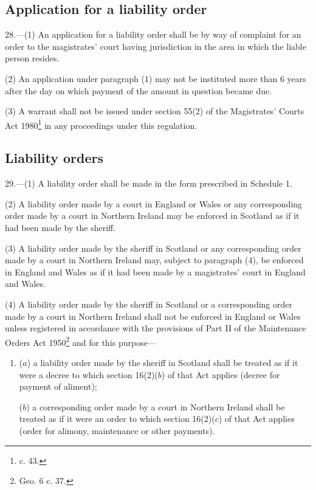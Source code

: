 \documentclass[12pt,a4paper]{article}
\begin{document}
\subsection[28. Application for a liability order]{Application for a liability order}

28.—(1) An application for a liability order shall be by way of complaint for an order to the magistrates' court having jurisdiction in the area in which the liable person resides.

(2) An application under paragraph (1) may not be instituted more than 6 years after the day on which payment of the amount in question became due.

(3) A warrant shall not be issued under section 55(2) of the Magistrates' Courts Act 1980\footnote{ c. 43.} in any proceedings under this regulation.

\subsection[29. Liability orders]{Liability orders}

29.—(1) A liability order shall be made in the form prescribed in Schedule 1.

(2) A liability order made by a court in England or Wales or any corresponding order made by a court in Northern Ireland may be enforced in Scotland as if it had been made by the sheriff.

(3) A liability order made by the sheriff in Scotland or any corresponding order made by a court in Northern Ireland may, subject to paragraph (4), be enforced in England and Wales as if it had been made by a magistrates' court in England and Wales.

(4) A liability order made by the sheriff in Scotland or a corresponding order made by a court in Northern Ireland shall not be enforced in England or Wales unless registered in accordance with the provisions of 
Part II %
of the Maintenance Orders Act 1950\footnote{ Geo. 6 c. 37.} and for this purpose—
\begin{enumerate}\item[]
($a$) a liability order made by the sheriff in Scotland shall be treated as if it were a decree to which section 16(2)($b$) of that Act applies (decree for payment of aliment);

($b$) a corresponding order made by a court in Northern Ireland shall be treated as if it were an order to which section 16(2)($c$) of that Act applies (order for alimony, maintenance or other payments).
\end{enumerate}
\end{document}

